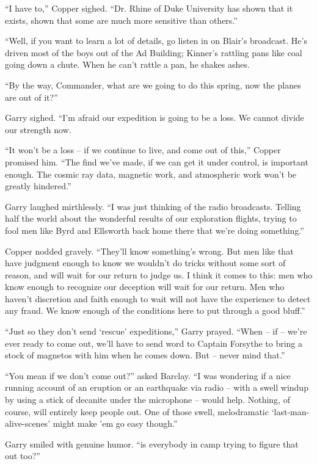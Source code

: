 \documentclass[letterpaper,openany,12pt]{memoir}		%
\begin{document}
``I have to,'' Copper sighed. ``Dr. Rhine of Duke University has shown that it
exists, shown that some are much more sensitive than others.''

``Well, if you want to learn a lot of details, go listen in on Blair's
broadcast. He's driven most of the boys out of the Ad Building; Kinner's
rattling pans like coal going down a chute. When he can't rattle a pan, he
shakes ashes.

``By the way, Commander, what are we going to do this spring, now the planes are
out of it?''

Garry sighed. ``I'm afraid our expedition is going to be a loss. We cannot
divide our strength now.

``It won't be a loss -- if we continue to live, and come out of this,'' Copper
promised him. ``The find we've made, if we can get it under control, is
important enough. The cosmic ray data, magnetic work, and atmospheric work won't
be greatly hindered.''

Garry laughed mirthlessly. ``I was just thinking of the radio broadcasts.
Telling half the world about the wonderful results of our exploration flights,
trying to fool men like Byrd and Ellsworth back home there that we're doing
something.''

Copper nodded gravely. ``They'll know something's wrong. But men like that have
judgment enough to know we wouldn't do tricks without some sort of reason, and
will wait for our return to judge us. I think it comes to this: men who know
enough to recognize our deception will wait for our return. Men who haven't
discretion and faith enough to wait will not have the experience to detect any
fraud. We know enough of the conditions here to put through a good bluff.''

``Just so they don't send `rescue' expeditions,'' Garry prayed. ``When -- if --
we're ever ready to come out, we'll have to send word to Captain Forsythe to
bring a stock of magnetos with him when he comes down. But -- never mind that.''

``You mean if we don't come out?'' asked Barclay. ``I was wondering if a nice
running account of an eruption or an earthquake via radio -- with a swell windup
by using a stick of decanite under the microphone -- would help. Nothing, of
course, will entirely keep people out. One of those swell, melodramatic
`last-man-alive-scenes' might make 'em go easy though.''

Garry smiled with genuine humor. ``is everybody in camp trying to figure that
out too?''
\end{document}
